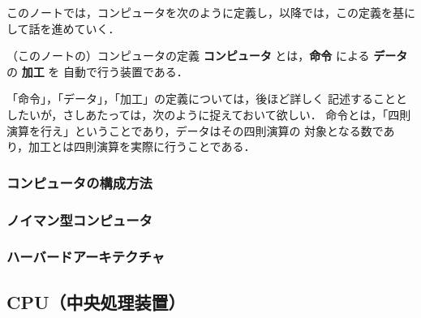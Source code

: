             このノートでは，コンピュータを次のように定義し，以降では，この定義を基にして話を進めていく．
                \begin{myshadebox}{（このノートの）コンピュータの定義}
                    \textbf{コンピュータ} とは，\textbf{命令} による \textbf{データ} の \textbf{加工} を
                    自動で行う装置である．
                \end{myshadebox}

            「命令」，「データ」，「加工」の定義については，後ほど詳しく
            記述することとしたいが，さしあたっては，次のように捉えておいて欲しい．
            命令とは，「四則演算を行え」ということであり，データはその四則演算の
            対象となる数であり，加工とは四則演算を実際に行うことである．

        \subsubsection{コンピュータの構成方法}

        \subsubsection{ノイマン型コンピュータ}

        \subsubsection{ハーバードアーキテクチャ}

    \subsection{CPU（中央処理装置）}
